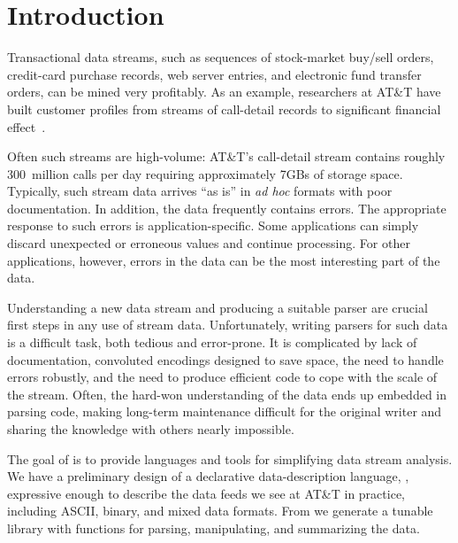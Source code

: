 \chapter{Introduction}
\label{chap:introduction}
Transactional data streams, such as sequences of stock-market buy/sell orders,
credit-card purchase records, web server entries, and electronic fund
transfer orders, can be mined very profitably.  As an example,
researchers at AT\&T have built customer profiles from streams of
call-detail records to significant financial effect~\cite{kdd98,kdd99,kdd00}.   

Often such streams are high-volume: AT\&T's call-detail stream contains
roughly 300~million calls per day requiring approximately 7GBs of
storage space.  Typically, such stream data arrives ``as is'' in
\textit{ad hoc} formats with poor documentation.  In addition, the
data frequently contains errors.  The appropriate response to such
errors is application-specific. Some applications can simply discard
unexpected or erroneous values and continue processing.  For other
applications, however, errors in the data can be the most interesting
part of the data.  

Understanding a new data stream and producing a suitable parser are
crucial first steps in any use of stream data.  Unfortunately, writing
parsers for such data is a difficult task, both tedious and
error-prone. It is complicated by lack of documentation, convoluted
encodings designed to save space, the need to handle errors
robustly, and the need to produce efficient code to cope with the
scale of the stream.  Often, the hard-won understanding of the data
ends up embedded in parsing code, making long-term maintenance
difficult for the original writer and sharing the knowledge with
others nearly impossible.

The goal of \PADS{} is to provide languages and tools for
simplifying data stream analysis.  We have a preliminary design of a
declarative data-description language, \PADSL{}, expressive enough to
describe the data feeds we see at AT\&T in practice, including ASCII,
binary, and mixed data formats.  From \PADSL{} we generate a tunable \C{}
library with functions for parsing, manipulating, and summarizing the data.  

